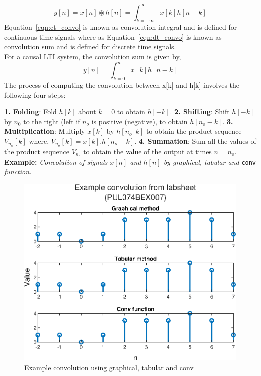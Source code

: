 \documentclass{lab_sheet}
\begin{document}
\begin{equation}
	y[n]=x[n]\circledast h[n]=\int_{k=-\infty}^{\infty}x[k]h[n-k]
	\label{eqn:dt_convo}
\end{equation}
Equation~\ref{eqn:ct_convo} is known as convolution integral and is defined for continuous time signals where as Equation~\ref{eqn:dt_convo} is known as convolution sum and is defined for discrete time signals.
\\
For a causal LTI system, the convolution sum is given by,
\begin{equation}
	y[n]=\int_{k=0}^{n}x[k]h[n-k]
	\label{eqn:causal_convo}
\end{equation}
The process of computing the convolution between x[k] and h[k] involves the following four
steps:

\textbf{1. Folding}: Fold $h[k]$ about $k=0$ to obtain $h[-k]$.
\textbf{2. Shifting}: Shift $h[-k]$ by $n_0$ to the right (left if $n_o$ is positive (negative), to obtain $h[n_o-k]$.
\textbf{3. Multiplication}: Multiply $x[k]$ by $h[n_o–k]$ to obtain the product sequence $V_{n_o}[k]$ where, $V_{n_o}[k]=x[k].h[n_o-k]$.
\textbf{4. Summation}: Sum all the values of the product sequence $V_{n_o}$ to obtain the value of
the output at times $n=n_o$.
\newpage
\textbf{Example:} \textit{Convolution of signals $x[n]$ and $h[n]$ by graphical, tabular and} \texttt{conv} \textit{function.}
\begin{figure}[H]
	\centering
	\includegraphics[width=0.8\linewidth]{../Figures/lab_3_example_all.eps}
	\caption{Example convolution using graphical, tabular and conv}
	\label{fig:example}
\end{figure}
\end{document}
